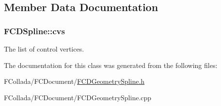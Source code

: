 \subsection{Member Data Documentation}
\hypertarget{classFCDSpline_a05d1e800f6a9036a4fcb48645f801e97}{
\subsubsection[{cvs}]{ {\bf FCDSpline::cvs}}}
\label{classFCDSpline_a05d1e800f6a9036a4fcb48645f801e97}
The list of control vertices. 

The documentation for this class was generated from the following files:\begin{DoxyCompactItemize}
\item 
FCollada/FCDocument/\hyperlink{FCDGeometrySpline_8h}{FCDGeometrySpline.h}\item 
FCollada/FCDocument/FCDGeometrySpline.cpp\end{DoxyCompactItemize}
